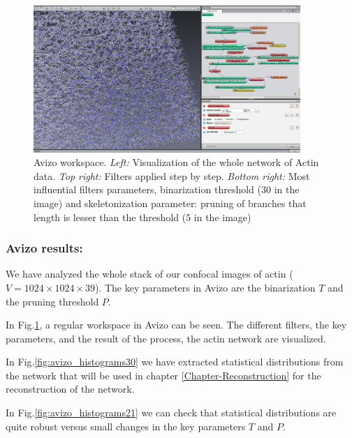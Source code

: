 \begin{figure}[H]


\includegraphics[width=0.9\textwidth]{Figures/chapter-image/avizo/workspace-wholedata.png}%

\caption[Avizo image: Actin network visualization and workspace]{Avizo
workspace. \emph{Left:} Visualization of the whole network of Actin data.
\emph{Top right:} Filters applied step by step. \emph{Bottom right:} Most
influential filters parameters, binarization threshold ($30$ in the image) and
skeletonization parameter: pruning of branches that length is lesser than the
threshold ($5$ in the image)}
\label{fig:avizo_workspace}
\end{figure}


\subsubsection{Avizo results:}
We have analyzed the whole stack of our confocal images of actin
($V=1024\times1024\times39$). The key parameters in Avizo are the binarization
$T$ and the pruning threshold $P$.

In Fig.\ref{fig:avizo_workspace}, a regular workspace in Avizo can be seen. The
different filters, the key parameters, and the result of the process, the actin
network are visualized.

In Fig.\ref{fig:avizo_histograms30} we have extracted statistical distributions
from the network that will be used in chapter \ref{Chapter-Reconstruction} for
the reconstruction of the network.

In Fig.\ref{fig:avizo_histograms21} we can check that statistical distributions
are quite robust versus small changes in the key parameters $T$ and $P$.

